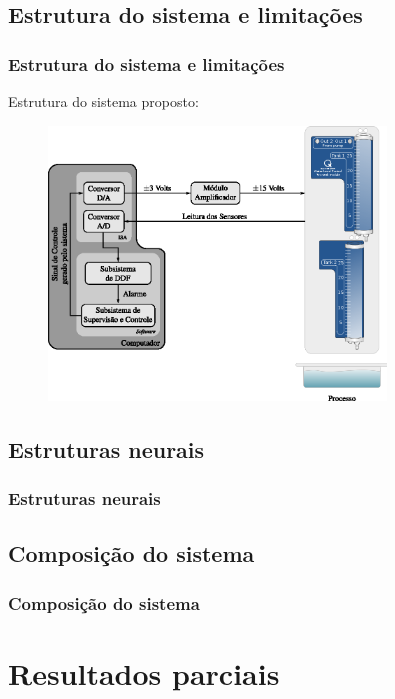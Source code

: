 \documentclass{beamer}
\begin{document}
\subsection{Estrutura do sistema e limitações}
\begin{frame}
    \frametitle{Estrutura do sistema e limitações}

    Estrutura do sistema proposto:

\begin{figure}[htb]
\centering
    \includegraphics[width=0.8\textwidth]{imgs/sistema/eps/func_sistema}
\end{figure}
\end{frame}


\subsection{Estruturas neurais}
\begin{frame}
    \frametitle{Estruturas neurais}

\end{frame}

\subsection{Composição do sistema}
\begin{frame}
    \frametitle{Composição do sistema}

    
\end{frame}

\section{Resultados parciais}
\end{document}
